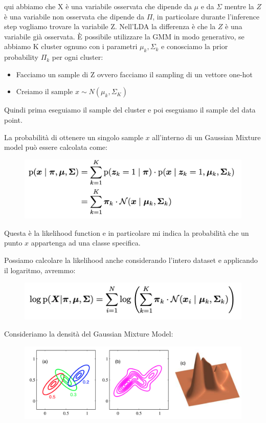 \documentclass[14pt]{extreport}
\begin{document}
qui abbiamo che X è una variabile osservata che dipende da $\mu$ e da $\Sigma$ mentre la $Z$ è una variabile non osservata che dipende da $\Pi$, in particolare 
durante l'inference step vogliamo trovare la variabile Z.
Nell'LDA la differenza è che la $Z$ è una variabile già osservata.
È possibile utilizzare la GMM in modo generativo, se abbiamo K cluster ognuno con i parametri $\mu_k, \Sigma_k$ e conosciamo la prior probability $\Pi_k$ per 
ogni cluster:

\begin{itemize}
\item Facciamo un sample di Z ovvero facciamo il sampling di un vettore one-hot
\item Creiamo il sample $x \sim N(\mu_k, \Sigma_K)$
\end{itemize}

Quindi prima eseguiamo il sample del cluster e poi eseguiamo il sample del data point.

La probabilità di ottenere un singolo sample $x$ all'interno di un Gaussian Mixture model può essere calcolata come:


\begin{figure}[H] 
\centering
\includegraphics[width=0.7\linewidth]{540.jpeg}
\end{figure}

Questa è la likelihood function e in particolare mi indica la probabilità che un punto $x$ appartenga 
ad una classe specifica.

Possiamo calcolare la likelihood anche considerando l'intero dataset e applicando il logaritmo, avremmo:

\begin{figure}[H] 
\centering
\includegraphics[width=0.7\linewidth]{541.jpeg}
\end{figure}

Consideriamo la densità del Gaussian Mixture Model:

\begin{figure}[H] 
\centering
\includegraphics[width=0.7\linewidth]{542.jpeg}
\end{figure}
\end{document}

